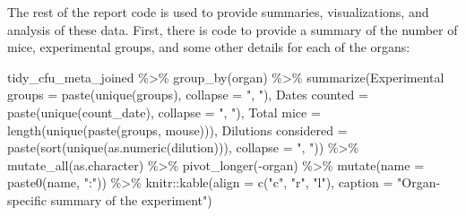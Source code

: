 \documentclass[
]{book}
\newenvironment{Shaded}{\begin{snugshade}}{\end{snugshade}}
\newcommand{\AttributeTok}[1]{\textcolor[rgb]{0.77,0.63,0.00}{#1}}
\newcommand{\FunctionTok}[1]{\textcolor[rgb]{0.00,0.00,0.00}{#1}}
\newcommand{\NormalTok}[1]{#1}
\newcommand{\OtherTok}[1]{\textcolor[rgb]{0.56,0.35,0.01}{#1}}
\newcommand{\SpecialCharTok}[1]{\textcolor[rgb]{0.00,0.00,0.00}{#1}}
\newcommand{\StringTok}[1]{\textcolor[rgb]{0.31,0.60,0.02}{#1}}
\begin{document}
The rest of the report code is used to provide summaries, visualizations, and
analysis of these data. First, there is code to provide a summary of the number
of mice, experimental groups, and some other details for each of the organs:

\begin{Shaded}
\begin{Highlighting}[]
\NormalTok{tidy\_cfu\_meta\_joined }\SpecialCharTok{\%\textgreater{}\%} 
  \FunctionTok{group\_by}\NormalTok{(organ) }\SpecialCharTok{\%\textgreater{}\%} 
  \FunctionTok{summarize}\NormalTok{(}\StringTok{\textasciigrave{}}\AttributeTok{Experimental groups}\StringTok{\textasciigrave{}} \OtherTok{=} \FunctionTok{paste}\NormalTok{(}\FunctionTok{unique}\NormalTok{(groups), }\AttributeTok{collapse =} \StringTok{", "}\NormalTok{),}
            \StringTok{\textasciigrave{}}\AttributeTok{Dates counted}\StringTok{\textasciigrave{}} \OtherTok{=} \FunctionTok{paste}\NormalTok{(}\FunctionTok{unique}\NormalTok{(count\_date), }\AttributeTok{collapse =} \StringTok{", "}\NormalTok{), }
            \StringTok{\textasciigrave{}}\AttributeTok{Total mice}\StringTok{\textasciigrave{}} \OtherTok{=} \FunctionTok{length}\NormalTok{(}\FunctionTok{unique}\NormalTok{(}\FunctionTok{paste}\NormalTok{(groups, mouse))), }
            \StringTok{\textasciigrave{}}\AttributeTok{Dilutions considered}\StringTok{\textasciigrave{}} \OtherTok{=} \FunctionTok{paste}\NormalTok{(}\FunctionTok{sort}\NormalTok{(}\FunctionTok{unique}\NormalTok{(}\FunctionTok{as.numeric}\NormalTok{(dilution))), }
                              \AttributeTok{collapse =} \StringTok{", "}\NormalTok{)) }\SpecialCharTok{\%\textgreater{}\%} 
  \FunctionTok{mutate\_all}\NormalTok{(as.character) }\SpecialCharTok{\%\textgreater{}\%} 
  \FunctionTok{pivot\_longer}\NormalTok{(}\SpecialCharTok{{-}}\NormalTok{organ) }\SpecialCharTok{\%\textgreater{}\%} 
  \FunctionTok{mutate}\NormalTok{(}\AttributeTok{name =} \FunctionTok{paste0}\NormalTok{(name, }\StringTok{":"}\NormalTok{)) }\SpecialCharTok{\%\textgreater{}\%} 
\NormalTok{  knitr}\SpecialCharTok{::}\FunctionTok{kable}\NormalTok{(}\AttributeTok{align =} \FunctionTok{c}\NormalTok{(}\StringTok{"c"}\NormalTok{, }\StringTok{"r"}\NormalTok{, }\StringTok{"l"}\NormalTok{), }
               \AttributeTok{caption =} \StringTok{"Organ{-}specific summary of the experiment"}\NormalTok{)}
\end{Highlighting}
\end{Shaded}
\end{document}
